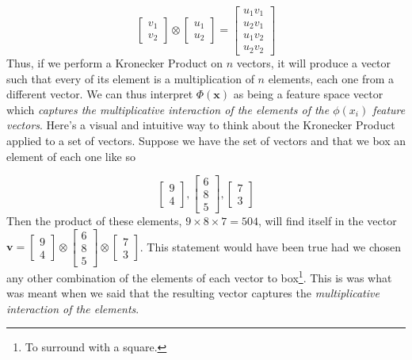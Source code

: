 \documentclass{article}
\theoremstyle{definition}
\theoremstyle{definition}
\begin{document}
\[
    \begin{bmatrix}
        v_1 \\ v_2
    \end{bmatrix}
    \otimes
    \begin{bmatrix}
        u_1 \\ u_2
    \end{bmatrix}
    =
    \begin{bmatrix}
        u_1 v_1 \\ u_2 v_1 \\ u_1v_2 \\ u_2v_2
    \end{bmatrix}
\]
Thus, if we perform a Kronecker Product on $n$ vectors, it will produce a vector such that every of its element is a multiplication of $n$ elements, each one from a different vector. We can thus interpret $\Phi(\mathbf{x})$ as being a feature space vector which \emph{captures the multiplicative interaction of the elements of the $\phi(x_i)$ feature vectors}. Here's a visual and intuitive way to think about the Kronecker Product applied to a set of vectors. Suppose we have the set of vectors and that we box an element of each one like so

\[
    \begin{bmatrix}
        \boxed{9} \\ 4
    \end{bmatrix},
    \begin{bmatrix}
        6 \\ \boxed{8} \\ 5
    \end{bmatrix},
    \begin{bmatrix}
        \boxed{7} \\ 3
    \end{bmatrix}
\]
Then the product of these elements,  $9\times8\times7=504$, will find itself in the vector $\bm{v}=
    \begin{bmatrix}
        9 \\ 4
    \end{bmatrix}
    \otimes
    \begin{bmatrix}
        6 \\ 8 \\ 5
    \end{bmatrix}
    \otimes
    \begin{bmatrix}
        7 \\ 3
    \end{bmatrix}
$. This statement would have been true had we chosen any other combination of the elements of each vector to box\footnote{To surround with a square.}. This is was what was meant when we said that the resulting vector captures the \emph{multiplicative interaction of the elements}.
\end{document}
